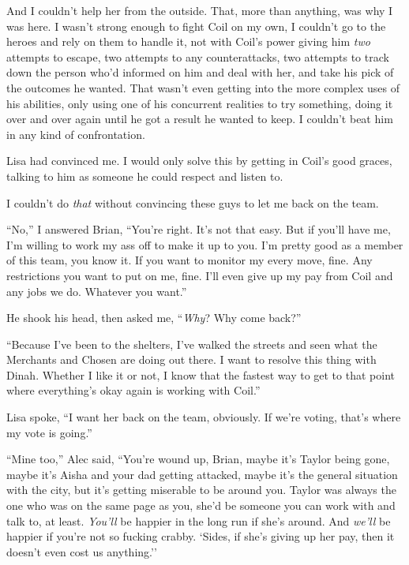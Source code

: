 And I couldn't help her from the outside.  That, more than anything, was why I was here.  I wasn't strong enough to fight Coil on my own, I couldn't go to the heroes and rely on them to handle it, not with Coil's power giving him \emph{two} attempts to escape, two attempts to any  counterattacks, two attempts to track down the person who'd informed on him and deal with her, and take his pick of the outcomes he wanted.  That wasn't even getting into the more complex uses of his abilities, only using one of his concurrent realities to try something, doing it over and over again until he got a result he wanted to keep.  I couldn't beat him in any kind of confrontation.



Lisa had convinced me.  I would only solve this by getting in Coil's good graces, talking to him as someone he could respect and listen to.



I couldn't do \emph{that} without convincing these guys to let me back on the team.



``No,'' I answered Brian, ``You're right.  It's not that easy.  But if you'll have me, I'm willing to work my ass off to make it up to you.  I'm pretty good as a member of this team, you know it.  If you want to monitor my every move, fine.  Any restrictions you want to put on me, fine.  I'll even give up my pay from Coil and any jobs we do.  Whatever you want.''



He shook his head, then asked me, ``\emph{Why}?  Why come back?''



``Because I've been to the shelters, I've walked the streets and seen what the Merchants and Chosen are doing out there.  I want to resolve this thing with Dinah.  Whether I like it or not, I know that the fastest way to get to that point where everything's okay again is working with Coil.''



Lisa spoke, ``I want her back on the team, obviously.  If we're voting, that's where my vote is going.''



``Mine too,'' Alec said, ``You're wound up, Brian, maybe it's Taylor being gone, maybe it's Aisha and your dad getting attacked, maybe it's the general situation with the city, but it's getting miserable to be around you.  Taylor was always the one who was on the same page as you, she'd be someone you can work with and talk to, at least.  \emph{You'll} be happier in the long run if she's around.  And \emph{we'll} be happier if you're not so fucking crabby.  `Sides, if she's giving up her pay, then it doesn't even cost us anything.''



